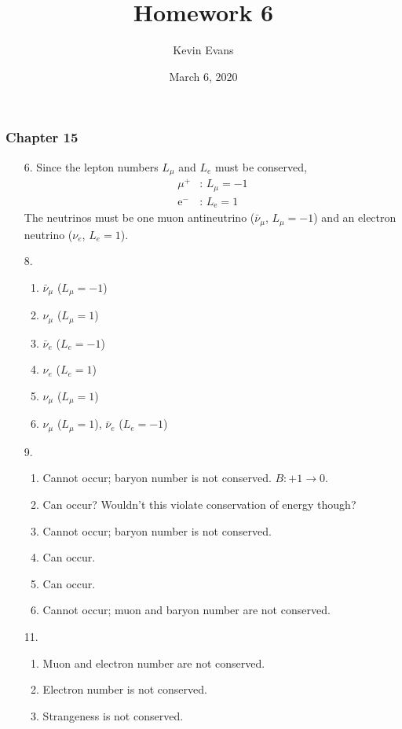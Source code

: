 \documentclass{homework}
\title{Homework 6}
\author{Kevin Evans}
\date{March 6, 2020}
\begin{document}
	\maketitle
	\subsubsection*{Chapter 15}
	\begin{enumerate}
		\item[6.] Since the lepton numbers $L_\mu$ and $L_e$ must be conserved,
			\begin{align*}
				\mu^+ &\text{: } L_\mu = -1 \\
				\mathrm{e}^- &\text{: } L_\mathrm{e} = 1
			\end{align*}
			The neutrinos must be one muon antineutrino ($\bar{\nu}_\mu$, $L_\mu=-1$) and an electron neutrino ($\nu_e$, $L_e=1$).
		\item[8.] \begin{enumerate}
			\item $\bar{\nu}_\mu$ ($L_\mu = -1$)
			\item $\nu_\mu$ ($L_\mu = 1$)
			\item $\bar{\nu}_e$ ($L_e = -1$)
			\item $\nu_e$ ($L_e = 1$)
			\item $\nu_\mu$ ($L_\mu = 1$)
			\item $\nu_\mu$ ($L_\mu = 1$), $\bar{\nu}_e$ ($L_e = -1$)
		\end{enumerate}
		\item[9.] \begin{enumerate}
			\item Cannot occur; baryon number is not conserved. $B: +1 \to 0$.
			\item Can occur? Wouldn't this violate conservation of energy though?
			\item Cannot occur; baryon number is not conserved.
			\item Can occur.
			\item Can occur.
			\item Cannot occur; muon and baryon number are not conserved.
		\end{enumerate}
		\item[11.] \begin{enumerate}
			\item Muon and electron number are not conserved.
			\item Electron number is not conserved.
			\item Strangeness is not conserved.

\end{enumerate}
\end{enumerate}
\end{document}
